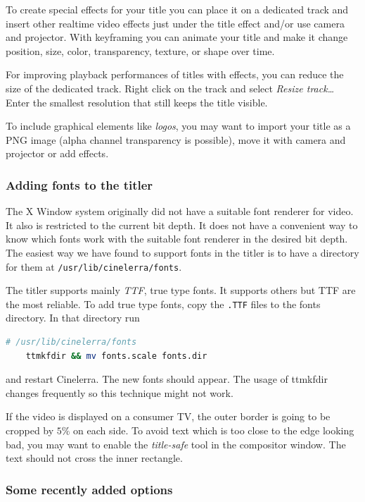 {To create special effects for your title you can place it on a dedicated track and insert other realtime video effects just under the title effect and/or use camera and projector. With keyframing you can animate your title and make it change position, size, color, transparency, texture, or shape over time.

For improving playback performances of titles with effects, you can reduce the size of the dedicated track. Right click on the track and select \textit{Resize track\dots} Enter the smallest resolution that still keeps the title visible.

To include graphical elements like \textit{logos}, you may want to import your title as a PNG image (alpha channel transparency is possible), move it with camera and projector or add effects.

\subsubsection*{Adding fonts to the titler}%
\label{ssub:adding_fonts_to_titler}

The X Window system originally did not have a suitable font renderer for video. It also is restricted to the current bit depth. It does not have a convenient way to know which fonts work with the suitable font renderer in the desired bit depth. The easiest way we have found to support fonts in the titler is to have a directory for them at \texttt{/usr/lib/cinelerra/fonts}.

The titler supports mainly \textit{TTF}, true type fonts. It supports others but TTF are the most reliable. To add true type fonts, copy the \texttt{.TTF} files to the fonts directory. In that directory run
\vspace{1ex}
\begin{lstlisting}[language=Bash,numbers=none]
    # /usr/lib/cinelerra/fonts
    ttmkfdir && mv fonts.scale fonts.dir
\end{lstlisting}
and restart Cinelerra. The new fonts should appear. The usage of ttmkfdir changes frequently so this technique might not work. 

If the video is displayed on a consumer TV, the outer border is going to be cropped by $5\%$ on each side. To avoid text which is too close to the edge looking bad, you may want to enable the \textit{title-safe} tool in the compositor window. The text should not cross the inner rectangle.

\subsubsection*{Some recently added options}%
\label{ssub:some_recently_added_options}

}
